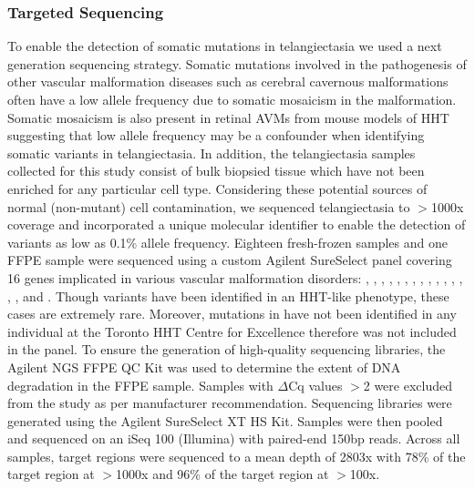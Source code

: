 \subsubsection{Targeted Sequencing}
To enable the detection of somatic mutations in telangiectasia we used a next generation sequencing strategy. Somatic mutations involved in the pathogenesis of other vascular malformation diseases such as cerebral cavernous malformations often have a low allele frequency due to somatic mosaicism in the malformation. Somatic mosaicism is also present in retinal AVMs from mouse models of HHT suggesting that low allele frequency may be a confounder when identifying somatic variants in telangiectasia. In addition, the telangiectasia samples collected for this study consist of bulk biopsied tissue which have not been enriched for any particular cell type. Considering these potential sources of normal (non-mutant) cell contamination, we sequenced telangiectasia to $>$1000x coverage and incorporated a unique molecular identifier to enable the detection of variants as low as 0.1\% allele frequency.
Eighteen fresh-frozen samples and one FFPE sample were sequenced using a custom Agilent SureSelect panel covering 16 genes implicated in various vascular malformation disorders: , , , , , , , , , , , , , , , and . Though  variants have been identified in an HHT-like phenotype, these cases are extremely rare. Moreover, mutations in  have not been identified in any individual at the Toronto HHT Centre for Excellence therefore  was not included in the panel. To ensure the generation of high-quality sequencing libraries, the Agilent NGS FFPE QC Kit was used to determine the extent of DNA degradation in the FFPE sample. Samples with $\Delta$Cq values $>$2 were excluded from the study as per manufacturer recommendation. Sequencing libraries were generated using the Agilent SureSelect XT HS Kit. Samples were then pooled and sequenced on an iSeq 100 (Illumina) with paired-end 150bp reads. Across all samples, target regions were sequenced to a mean depth of 2803x with 78\% of the target region at $>$1000x and 96\% of the target region at $>$100x. 

